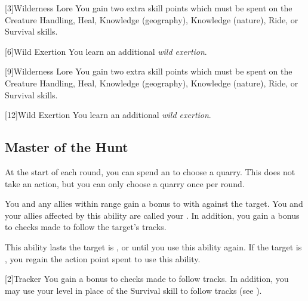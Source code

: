         [3]{Wilderness Lore} You gain two extra skill points which must be spent on the Creature Handling, Heal, Knowledge (geography), Knowledge (nature), Ride, or Survival skills.

        [6]{Wild Exertion}
        You learn an additional \textit{wild exertion}.

        [9]{Wilderness Lore} You gain two extra skill points which must be spent on the Creature Handling, Heal, Knowledge (geography), Knowledge (nature), Ride, or Survival skills.

        [12]{Wild Exertion} 
        You learn an additional \textit{wild exertion}.

    \subsection{Master of the Hunt}

        \label{Quarry}
        At the start of each round, you can spend an  to choose a quarry.
        This does not take an action, but you can only choose a quarry once per round.
        \begin{ability}
            \begin{spelltargetinginfo}
            \end{spelltargetinginfo}
            \begin{spelleffects}
                \spelleffect You and any allies within range gain a  bonus to  with  against the target.
                You and your allies affected by this ability are called your .
                In addition, you gain a  bonus to checks made to follow the target's tracks.

                This ability lasts the target is , or until you use this ability again.
                If the target is , you regain the action point spent to use this ability.
            \end{spelleffects}
        \end{ability}

        [2]{Tracker}
        You gain a  bonus to checks made to follow tracks.
        In addition, you may use your level in place of the Survival skill to follow tracks (see ).

